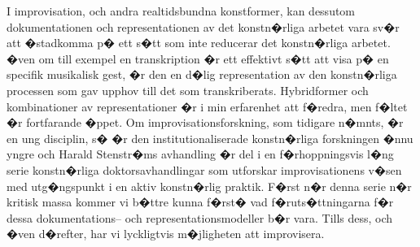 \documentclass[a4paper]{article}
\begin{document}
I improvisation, och andra realtidsbundna konstformer, kan dessutom dokumentationen och representationen av det konstn�rliga arbetet vara sv�r att �stadkomma p� ett s�tt som inte reducerar det konstn�rliga arbetet. �ven om till exempel en transkription �r ett effektivt s�tt att visa p� en specifik musikalisk gest, �r den en d�lig representation av den konstn�rliga processen som gav upphov till det som transkriberats. Hybridformer och kombinationer av representationer �r i min erfarenhet att f�redra, men f�ltet �r fortfarande �ppet. Om improvisationsforskning, som tidigare n�mnts, �r en ung disciplin, s� �r den institutionaliserade konstn�rliga forskningen �nnu yngre och Harald Stenstr�ms avhandling �r del i en f�rhoppningsvis l�ng serie konstn�rliga doktorsavhandlingar som utforskar improvisationens v�sen med utg�ngspunkt i en aktiv konstn�rlig praktik. F�rst n�r denna serie n�r kritisk massa kommer vi b�ttre kunna f�rst� vad f�ruts�ttningarna f�r dessa dokumentations-- och representationsmodeller b�r vara. Tills dess, och �ven d�refter, har vi lyckligtvis m�jligheten att improvisera.












\end{document}
